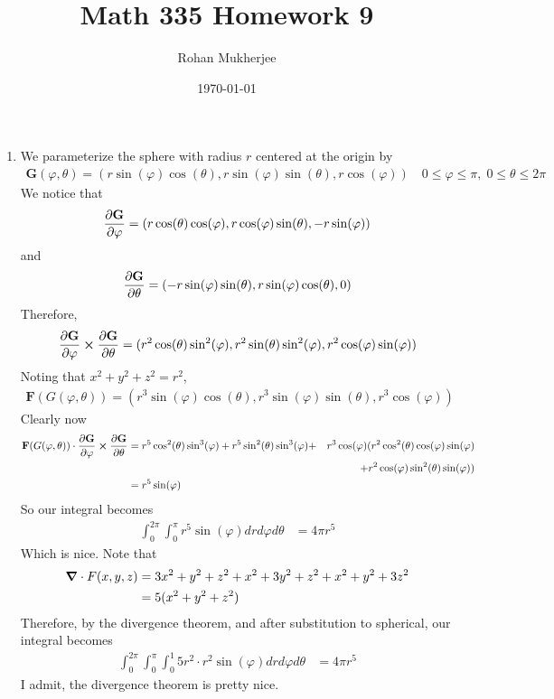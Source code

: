 \documentclass[12pt]{article}
\title{Math 335 Homework 9}
\date{\today}
\author{Rohan Mukherjee}
\theoremstyle{definition}
\theoremstyle{remark}
\newcommand{\cph}{\varphi}
\renewcommand{\th}{\theta}
\begin{document}
	\maketitle
	\begin{enumerate}[leftmargin=\labelsep]
		\item We parameterize the sphere with radius $r$ centered at the origin by 
		\begin{align*}
			\textbf{G}(\cph, \theta) = (r\sin(\cph)\cos(\theta), r\sin(\cph)\sin(\theta), r\cos(\cph)) \quad 0 \leq \cph \leq \pi, \; 0 \leq \theta \leq 2\pi
		\end{align*}
		We notice that 
		\begin{align*}
			\pdv{\textbf{G}}{\cph} = (r\cos(\theta)\cos(\cph), r\cos(\cph)\sin(\theta), -r\sin(\cph))
		\end{align*}
		and 
		\begin{align*}
			\pdv{\textbf{G}}{\theta} = (-r\sin(\cph)\sin(\theta), r\sin(\cph)\cos(\theta), 0)
		\end{align*}
		Therefore,
		\begin{align*}
			\pdv{\textbf{G}}{\cph} \cross \pdv{\textbf{G}}{\theta} = (r^2\cos(\theta)\sin^2(\cph), r^2\sin(\theta)\sin^2(\cph), r^2\cos(\cph)\sin(\cph))
		\end{align*} Noting that $x^2+y^2+z^2 = r^2$, 
		\begin{align*}
			\textbf{F}(G(\cph, \theta)) = (r^3\sin(\cph)\cos(\th), r^3\sin(\cph)\sin(\th), r^3\cos(\cph))
		\end{align*}
		Clearly now 
		\begin{align*}
			\textbf{F}(G(\cph, \theta)) \cdot \pdv{\textbf{G}}{\cph} \cross \pdv{\textbf{G}}{\theta} &= r^5\cos^2(\theta)\sin^3(\cph)+r^5\sin^2(\th)\sin^3(\cph)+&r^3\cos(\cph)(r^2\cos^2(\th)\cos(\cph)\sin(\cph)\\&&+r^2\cos(\cph)\sin^2(\theta)\sin(\cph)) \\
			&= r^5\sin(\cph)
		\end{align*}
		So our integral becomes
		\begin{align*}
			\int_0^{2\pi}\int_0^\pi r^5\sin(\cph)drd\cph d\th &= 4\pi r^5
		\end{align*}
		Which is nice.
		Note that
		\begin{align*}
			\grad \cdot F(x, y, z) &= 3x^2+y^2+z^2+x^2+3y^2+z^2+x^2+y^2+3z^2 \\
			&= 5(x^2+y^2+z^2)
		\end{align*}
		Therefore, by the divergence theorem, and after substitution to spherical, our integral becomes
		\begin{align*}
			\int_0^{2\pi} \int_0^\pi \int_0^1 5r^2 \cdot r^2 \sin(\cph) drd\cph d\theta &= 4\pi r^5
		\end{align*}
		I admit, the divergence theorem is pretty nice.
		

\end{enumerate}
\end{document}
